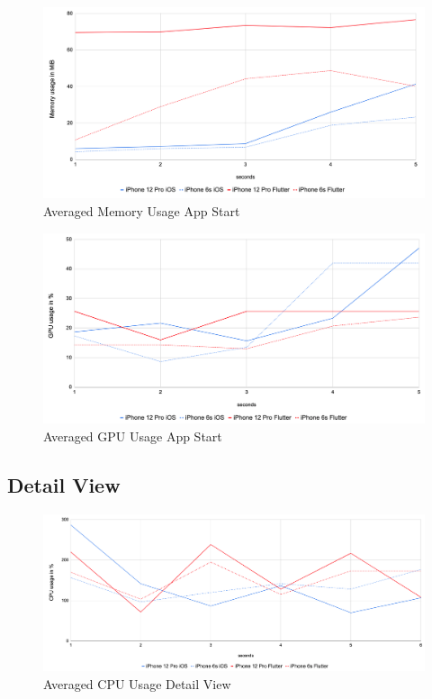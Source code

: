 \begin{figure}[!h]
    \centering
    \includegraphics[width=\linewidth]{images/performance_results/app_start/avg_memory_usage_app_start.png}
    \caption{Averaged Memory Usage App Start}
    \label{fig:avg_memory_usage_app_start}
\end{figure}

\begin{figure}[!h]
    \centering
    \includegraphics[width=\linewidth]{images/performance_results/app_start/avg_gpu_usage_app_start.png}
    \caption{Averaged GPU Usage App Start}
    \label{fig:avg_gpu_usage_app_start}
\end{figure}


\subsection{Detail View}
\begin{figure}[!h]
    \centering
    \includegraphics[width=\linewidth]{images/performance_results/detail_view/avg_cpu_usage_detail_view.png}
    \caption{Averaged CPU Usage Detail View}
    \label{fig:avg_cpu_usage_detail_view}
\end{figure}

